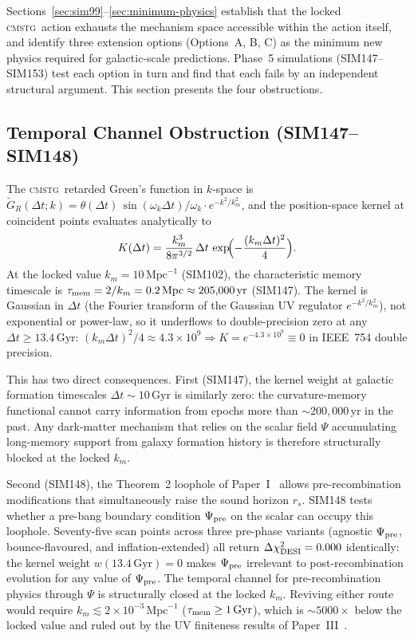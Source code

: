 \documentclass[12pt,a4paper]{article}
\newcommand{\CMSTG}{\textsc{cmstg}}
\theoremstyle{plain}
\begin{document}
Sections~\ref{sec:sim99}--\ref{sec:minimum-physics} establish that the locked
\CMSTG\ action exhausts the mechanism space accessible within the action itself,
and identify three extension options (Options~A, B, C) as the minimum new physics
required for galactic-scale predictions. Phase~5 simulations (SIM147--SIM153) test
each option in turn and find that each fails by an independent structural argument.
This section presents the four obstructions.

\subsection{Temporal Channel Obstruction (SIM147--SIM148)}
\label{sec:temporal}

The \CMSTG\ retarded Green's function in $k$-space is
$\tilde{G}_R(\Delta t; k) = \theta(\Delta t)\,\sin(\omega_k\Delta t)/\omega_k
\cdot e^{-k^2/k_m^2}$, and the position-space kernel at coincident points
evaluates analytically to
\begin{equation}
  K(\Delta t) = \frac{k_m^3}{8\pi^{3/2}}\,\Delta t\,
  \exp\!\Bigl(-\frac{(k_m\Delta t)^2}{4}\Bigr).
  \label{eq:kernel}
\end{equation}
At the locked value $k_m = 10\,\mathrm{Mpc}^{-1}$ (SIM102), the characteristic
memory timescale is $\tau_{\rm mem} = 2/k_m = 0.2\,\mathrm{Mpc}
\approx 205{,}000\,\mathrm{yr}$ (SIM147).  The kernel is Gaussian in $\Delta t$
(the Fourier transform of the Gaussian UV regulator $e^{-k^2/k_m^2}$), not
exponential or power-law, so it underflows to double-precision zero at
any $\Delta t \geq 13.4\,\mathrm{Gyr}$: $(k_m\Delta t)^2/4 \approx 4.3\times10^9
\Rightarrow K = e^{-4.3\times10^9} \equiv 0$ in IEEE~754 double precision.

This has two direct consequences. First (SIM147), the kernel weight at galactic
formation timescales $\Delta t \sim 10\,\mathrm{Gyr}$ is similarly zero:
the curvature-memory functional cannot carry information from epochs more than
$\sim200{,}000\,\mathrm{yr}$ in the past. Any dark-matter mechanism that relies
on the scalar field $\Psi$ accumulating long-memory support from galaxy formation
history is therefore structurally blocked at the locked $k_m$.

Second (SIM148), the Theorem~2 loophole of Paper~I~\cite{WilsonPaperI} allows
pre-recombination modifications that simultaneously raise the sound horizon $r_s$.
SIM148 tests whether a pre-bang boundary condition $\Psi_{\rm pre}$ on the scalar
can occupy this loophole.  Seventy-five scan points across three pre-phase variants
(agnostic $\Psi_{\rm pre}$, bounce-flavoured, and inflation-extended) all return
$\Delta\chi^2_{\rm DESI} = 0.000$ identically: the kernel weight
$w(13.4\,\mathrm{Gyr}) = 0$ makes $\Psi_{\rm pre}$ irrelevant to post-recombination
evolution for any value of $\Psi_{\rm pre}$.  The temporal channel for
pre-recombination physics through $\Psi$ is structurally closed at the locked $k_m$.
Reviving either route would require $k_m \lesssim 2\times10^{-3}\,\mathrm{Mpc}^{-1}$
($\tau_{\rm mem} \geq 1\,\mathrm{Gyr}$), which is $\sim5000\times$ below the locked
value and ruled out by the UV finiteness results of Paper~III~\cite{WilsonPaperIII}.
\end{document}
